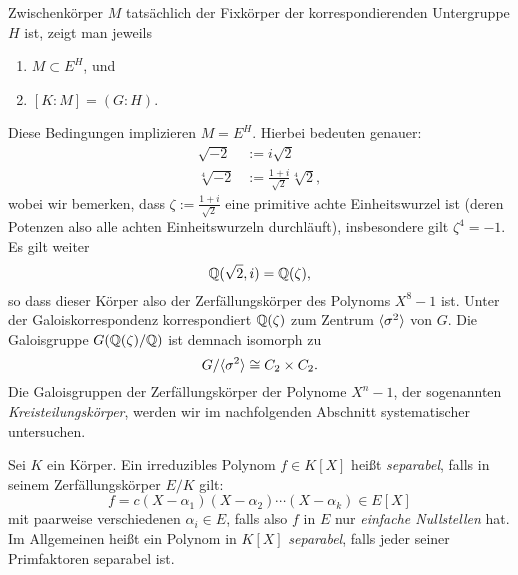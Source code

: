\documentclass{book}
\begin{document}
\begin{exa}
    Zwischenkörper $M$ tatsächlich der Fixkörper der korrespondierenden
    Untergruppe $H$ ist, zeigt man jeweils
    \begin{enumerate}[label = \arabic *.]
        \item $M \subset E^H$, und
        \item $[K:M] = (G:H)$.
    \end{enumerate}
    Diese Bedingungen implizieren $M = E^H$. Hierbei bedeuten genauer:
    \begin{align*}
        \sqrt{-2} & := i \sqrt{2}\\
        \sqrt[4]{-2} & := \frac{1+i}{\sqrt{2}}\sqrt[4]{2},
    \end{align*}
    wobei wir bemerken, dass $\zeta := \frac{1+i}{\sqrt{2}}$ eine primitive
    achte Einheitswurzel ist (deren Potenzen also alle achten Einheitswurzeln
    durchläuft), insbesondere gilt $\zeta^4 = -1$. Es gilt weiter
    \[
        \mathbb{Q}(\sqrt{2}, i) = \mathbb{Q}(\zeta),
    \]
    so dass dieser Körper also der Zerfällungskörper des Polynoms $X^8 - 1$
    ist. Unter der Galoiskorrespondenz korrespondiert $\mathbb{Q}(\zeta)$ zum Zentrum
    $\langle \sigma^2 \rangle$ von $G$. Die Galoisgruppe $G(\mathbb{Q}(\zeta)/\mathbb{Q})$ ist demnach
    isomorph zu
    \[
        G/\langle \sigma^2 \rangle \cong C_2 \times C_2.
    \]
    Die Galoisgruppen der Zerfällungskörper der Polynome $X^n -1$, der
    sogenannten {\em Kreisteilungskörper}, werden wir im nachfolgenden Abschnitt
    systematischer untersuchen.
\end{exa}

\begin{defi}
    \label{defi:sep}
    Sei $K$ ein Körper. Ein irreduzibles Polynom $f \in K[X]$ heißt \emph{separabel}, falls in seinem Zerfällungskörper $E/K$ gilt:
    \[
        f = c (X-\alpha_1)(X-\alpha_2) \cdots (X-\alpha_k) \in E[X]
    \]
    mit paarweise verschiedenen $\alpha_i \in E$, falls also $f$ in $E$ nur
    \emph{einfache Nullstellen} hat. Im Allgemeinen heißt ein Polynom in $K[X]$ \emph{separabel},
    falls jeder seiner Primfaktoren separabel ist. 
\end{defi}
\end{document}
